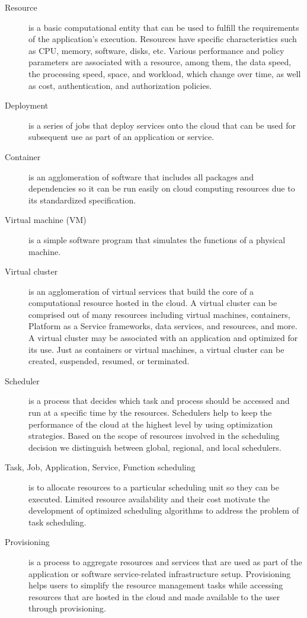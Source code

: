 \documentclass[final,5p,times,twocolumn]{elsarticle}
\begin{document}
\begin{description}

\item[Resource] is a basic computational entity that can be used to fulfill the requirements of the application's execution. Resources have specific characteristics such as CPU, memory, software, disks, etc. Various performance and policy parameters are associated with a resource, among them, the data speed, the processing speed, space, and workload, which change over time, as well as cost, authentication, and authorization policies.

\item[Deployment] is a series of jobs that deploy services onto the cloud that can be used for subsequent use as part of an application or service.

\item[Container] is an agglomeration of software that includes all packages and dependencies so it can be run easily on cloud computing resources due to its standardized specification.

\item[Virtual machine (VM)] is a simple software program that simulates the functions of a physical machine.

\item[Virtual cluster] is an agglomeration of virtual services that build the core of a computational resource hosted in the cloud. A virtual cluster can be comprised out of many resources including virtual machines, containers, Platform as a Service frameworks, data services, and resources, and more. A virtual cluster may be associated with an application and optimized for its use. Just as containers or virtual machines, a virtual cluster can be created, suspended, resumed, or terminated. 

\item[Scheduler] is a process that decides which task and process should be accessed and run at a specific time by the resources. Schedulers help to keep the performance of the cloud at the highest level by using optimization strategies. Based on the scope of resources involved in the scheduling decision we distinguish between global, regional, and local schedulers.
 
\item[Task, Job, Application, Service, Function scheduling] is to allocate resources to a particular scheduling unit so they can be executed. Limited resource availability and their cost motivate the development of optimized scheduling algorithms to address the problem of task scheduling.
 
\item[Provisioning] is a process to aggregate resources and services that are used as part of the application or software service-related infrastructure setup. Provisioning helps users to simplify the resource management tasks while accessing resources that are hosted in the cloud and made available to the user through provisioning. 

\end{description}
\end{document}
